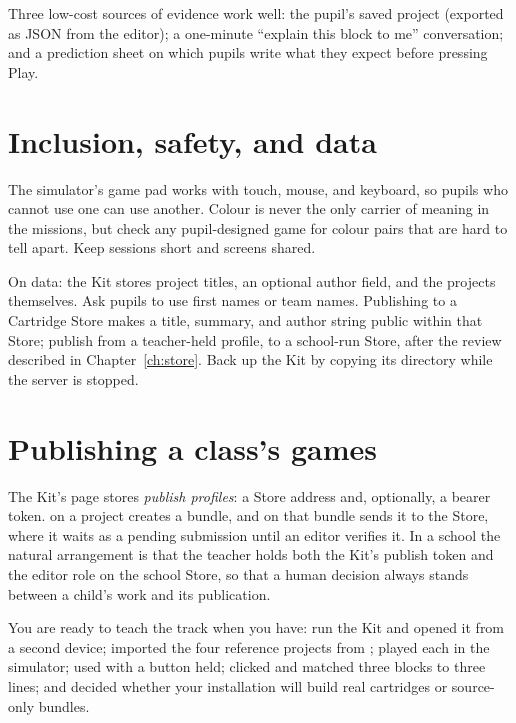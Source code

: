 Three low-cost sources of evidence work well: the pupil's saved project
(exported as JSON from the editor); a one-minute ``explain this block to me''
conversation; and a prediction sheet on which pupils write what they expect
before pressing Play.

\section{Inclusion, safety, and data}

The simulator's game pad works with touch, mouse, and keyboard, so pupils who
cannot use one can use another. Colour is never the only carrier of meaning in
the missions, but check any pupil-designed game for colour pairs that are hard
to tell apart. Keep sessions short and screens shared.

On data: the Kit stores project titles, an optional author field, and the
projects themselves. Ask pupils to use first names or team names. Publishing
to a Cartridge Store makes a title, summary, and author string public within
that Store; publish from a teacher-held profile, to a school-run Store, after
the review described in Chapter~\ref{ch:store}. Back up the Kit by copying its
 directory while the server is stopped.

\section{Publishing a class's games}

The Kit's  page stores \emph{publish profiles}: a Store address
and, optionally, a bearer token.  on a project creates
a bundle, and  on that bundle sends it to the Store, where it
waits as a pending submission until an editor verifies it. In a school the
natural arrangement is that the teacher holds both the Kit's publish token and
the editor role on the school Store, so that a human decision always stands
between a child's work and its publication.

\begin{prgcheck}
You are ready to teach the track when you have: run the Kit and opened it from
a second device; imported the four reference projects from
; played each in the simulator; used
 with a button held; clicked  and matched three
blocks to three lines; and decided whether your installation will build real
cartridges or source-only bundles.
\end{prgcheck}
